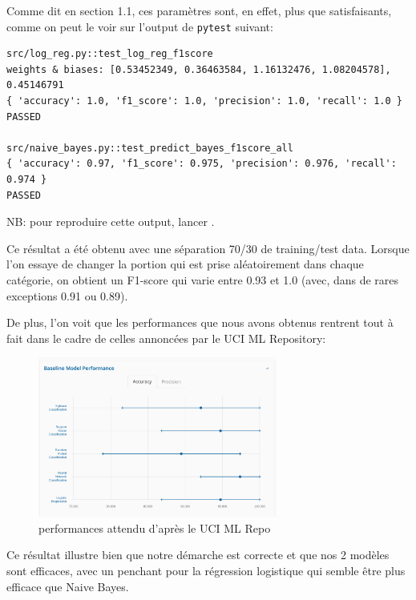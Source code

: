 \documentclass[
]{article}
\begin{document}
\vspace{0.3cm}

Comme dit en section 1.1, ces paramètres sont, en effet, plus que
satisfaisants, comme on peut le voir sur l'output de \texttt{pytest}
suivant:

\begin{lstlisting}
src/log_reg.py::test_log_reg_f1score 
weights & biases: [0.53452349, 0.36463584, 1.16132476, 1.08204578], 0.45146791  
{ 'accuracy': 1.0, 'f1_score': 1.0, 'precision': 1.0, 'recall': 1.0 }
PASSED

src/naive_bayes.py::test_predict_bayes_f1score_all  
{ 'accuracy': 0.97, 'f1_score': 0.975, 'precision': 0.976, 'recall': 0.974 }
PASSED
\end{lstlisting}

NB: pour reproduire cette output, lancer .

Ce résultat a été obtenu avec une séparation 70/30 de training/test
data. Lorsque l'on essaye de changer la portion qui est prise
aléatoirement dans chaque catégorie, on obtient un F1-score qui varie
entre 0.93 et 1.0 (avec, dans de rares exceptions 0.91 ou 0.89).

De plus, l'on voit que les performances que nous avons obtenus rentrent
tout à fait dans le cadre de celles annoncées par le UCI ML Repository:

\begin{figure}
\centering
\includegraphics[width=0.7\textwidth,height=\textheight]{../res/screenshot_ucmi_perfs.png}
\caption{performances attendu d'après le UCI ML Repo \cite{IrisWebsite}}
\end{figure}

Ce résultat illustre bien que notre démarche est correcte et que nos 2
modèles sont efficaces, avec un penchant pour la régression logistique
qui semble être plus efficace que Naive Bayes.

\newpage{}
\end{document}
